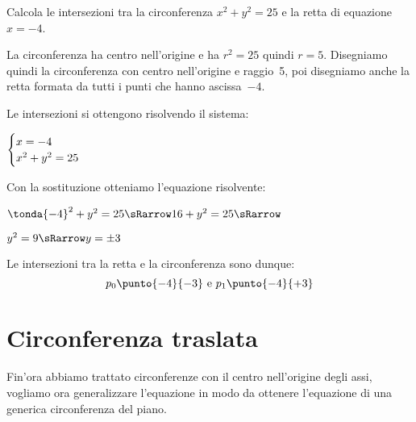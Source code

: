 \begin{esempio}
Calcola le intersezioni tra la circonferenza  \(x^2 + y^2 = 25\) e la 
retta di equazione \(x=-4\).

\noindent\begin{minipage}{.48\textwidth}
La circonferenza ha centro nell'origine e ha \(r^2 = 25\) quindi \(r=5\). 
Disegniamo quindi la circonferenza con centro nell'origine e raggio~5,
poi disegniamo anche la retta formata da tutti i punti che hanno ascissa~\(-4\).

Le intersezioni si ottengono risolvendo il sistema:

\(\begin{cases}x=-4 \\ x^2 + y^2 = 25\end{cases}\)

Con la sostituzione otteniamo l'equazione risolvente: 

\(\tonda{-4}^2 + y^2 = 25 \sRarrow 16 + y^2 = 25 \sRarrow\)

\(y^2 = 9 \sRarrow y= \pm 3\)

Le intersezioni tra la retta e la circonferenza sono dunque: 
\[p_0 \punto{-4}{-3} \text { e } p_1 \punto{-4}{+3}\]
\end{minipage}
\hfill
\begin{minipage}{.48\textwidth}
\begin{center}
\begin{inaccessibleblock}
  \circonfretta
\end{inaccessibleblock}
\end{center}
\end{minipage}
\end{esempio}

% 

\section{Circonferenza traslata}
\label{sec:circ_circtraslata}

Fin'ora abbiamo trattato circonferenze con il centro nell'origine degli assi, 
vogliamo ora generalizzare l'equazione in modo da ottenere l'equazione di una 
generica circonferenza del piano.

